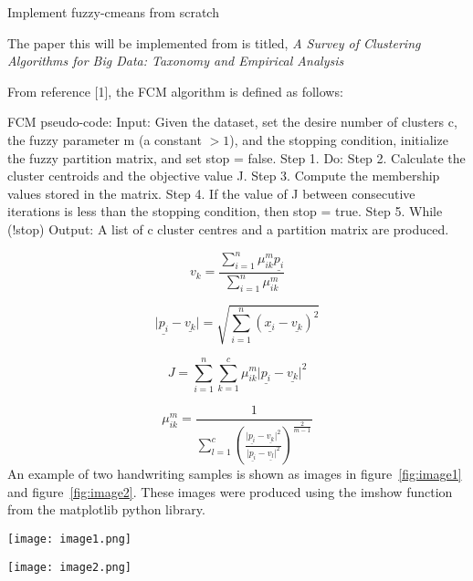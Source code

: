 Implement fuzzy-cmeans from scratch

The paper this will be implemented from is titled, \textit{A Survey of Clustering Algorithms for Big Data: Taxonomy and Empirical Analysis}


From reference [1], the FCM algorithm is defined as follows: \newline

\begin{tcolorbox}
FCM pseudo-code:  \newline
Input: Given the dataset, set the desire number of clusters c, the fuzzy parameter m (a constant $> 1$), and the stopping condition, initialize the fuzzy partition matrix, and set stop = false.  \newline
Step 1. Do:  \newline
Step 2. Calculate the cluster centroids and the objective value J.\newline
Step 3. Compute the membership values stored in the matrix.  \newline
Step 4. If the value of J between consecutive iterations is less than the stopping condition, then stop = true.  \newline
Step 5. While (!stop)  \newline
Output: A list of c cluster centres and a partition matrix are produced.   
\end{tcolorbox}  


\begin{equation}
\label{eq:vk}
v_{k}=\frac{\sum_{i=1}^n{{\mu^{m}_{{i}{k}}{{\underline{p_{i}}}}}}}{\sum_{i=1}^n{{\mu^{m}_{{i}{k}}}}}
\end{equation}
   
\begin{equation}
\label{eq:distance}     
{\vert{\underline{p_{i}}}-{\underline{v_{k}}}\vert}=\sqrt{\sum_{i=1}^{n}{({\underline{x_{i}}}-{\underline{v_{k}}})^2}}
\end{equation}
  
\begin{equation}
\label{eq:objective_function}
J=\sum_{i=1}^{n}{\sum_{k=1}^{c}{\mu^{m}_{{i}{k}}{\vert{\underline{p_{i}}}-{\underline{v_{k}}}\vert^{2}}}}
\end{equation}  

\begin{equation}
\label{eq:membership_value}
{\mu^{m}_{{i}{k}}}=\frac{1}{\sum_{l=1}^{c}{(\frac{{\vert{\underline{p_{i}}}-{\underline{v_{k}}}\vert^{2}}}{{\vert{\underline{p_{i}}}-{\underline{v_{l}}}\vert^{2}}})}^{\frac{2}{m-1}}}
\end{equation}
An example of two handwriting samples is shown as images in figure~\ref{fig:image1} and figure~\ref{fig:image2}. These images were produced using the imshow function from the matplotlib python library.\newline

\begin{center}
\texttt{[image: image1.png]}
\end{center}

\begin{center}
\texttt{[image: image2.png]}
\end{center}    
        